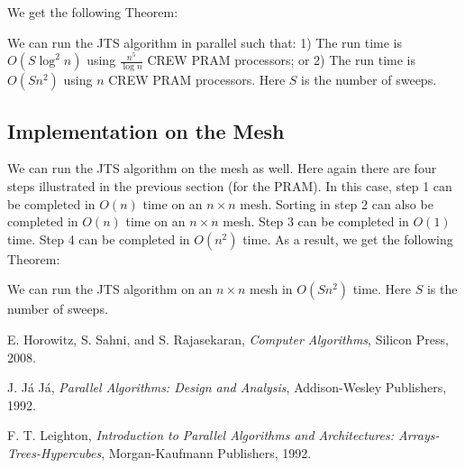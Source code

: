 We get the following Theorem:

\begin{theorem}
We can run the JTS algorithm in parallel such that: 1) The run time is $O(S\log^2n)$ using $\frac{n^5}{\log n}$ CREW PRAM processors; or 2) The run time is $O(Sn^2)$ using $n$ CREW PRAM processors. Here $S$ is the number of sweeps.
\end{theorem}

\subsection{Implementation on the Mesh}
We can run the JTS algorithm on the mesh as well. Here again there are four steps illustrated in the previous section (for the PRAM). In this case, step 1 can be completed in $O(n)$ time on an $n\times n$ mesh. Sorting in step 2 can also be completed in $O(n)$ time on an $n\times n$ mesh. Step 3 can be completed in $O(1)$ time. Step 4 can be completed in $O(n^2)$ time. As a result, we get the following Theorem:

\begin{theorem}
We can run the JTS algorithm on an $n\times n$ mesh in $O(Sn^2)$ time. Here $S$ is the number of sweeps.
\end{theorem}

\begin{thebibliography}{999}


 E. Horowitz, S. Sahni, and S. Rajasekaran,
{\em Computer Algorithms}, Silicon Press, 2008.

 J. J\'{a} J\'{a}, {\em Parallel Algorithms:
Design and Analysis}, Addison-Wesley Publishers, 1992.


 F. T. Leighton, {\em Introduction to Parallel Algorithms and
Architectures: Arrays-Trees-Hypercubes}, Morgan-Kaufmann Publishers, 1992.


\end{thebibliography}

